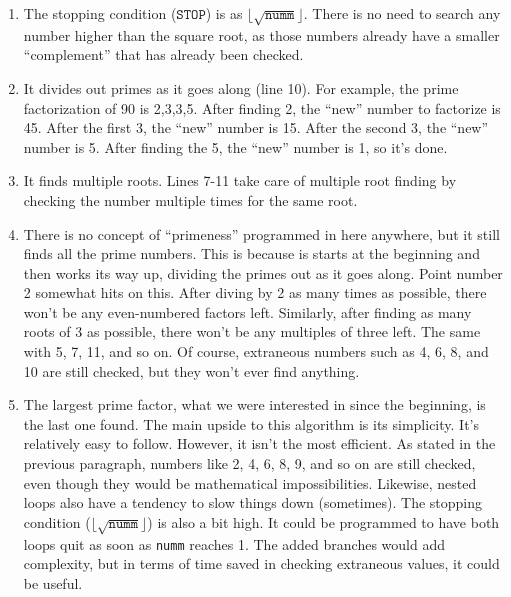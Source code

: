 \documentclass{article}
\begin{document}
\begin{enumerate}
\item The stopping condition ($\texttt{STOP}$) is as $\lfloor\sqrt{\texttt{numm}}\rfloor$.  
There is no need to search any number higher than the square root, as those numbers already 
have a smaller “complement” that has already been checked.

\item It divides out primes as it goes along (line 10). For example, the prime factorization 
of 90 is 2,3,3,5. After finding 2, the ``new'' number to factorize is 45. After the first 3, 
the ``new'' number is 15. After the second 3, the ``new'' number is 5. After finding the 5, 
the ``new'' number is 1, so it’s done.

\item It finds multiple roots. Lines 7-11 take care of multiple root finding by checking the 
number multiple times for the same root.

\item There is no concept of “primeness” programmed in here anywhere, but it still finds all 
the prime numbers. This is because is starts at the beginning and then works its way up, 
dividing the primes out as it goes along. Point number 2 somewhat hits on this. After diving 
by 2 as many times as possible, there won’t be any even-numbered factors left. Similarly, 
after finding as many roots of 3 as possible, there won’t be any multiples of three left. The 
same with 5, 7, 11, and so on. Of course, extraneous numbers such as 4, 6, 8, and 10 are 
still checked, but they won’t ever find anything.

\item The largest prime factor, what we were interested in since the beginning, is the last 
one found. The main upside to this algorithm is its simplicity. It’s relatively easy to 
follow. However, it isn’t the most efficient. As stated in the previous paragraph, numbers 
like 2, 4, 6, 8, 9, and so on are still checked, even though they would be mathematical 
impossibilities. Likewise, nested loops also have a tendency to slow things down (sometimes). 
The stopping condition ($\lfloor\sqrt{\texttt{numm}}\rfloor$) is also a bit high. It could be 
programmed to have both loops quit as soon as \texttt{numm} reaches 1. The added branches 
would add complexity, but in terms of time saved in checking extraneous values, it could be 
useful.

\end{enumerate}
\end{document}
